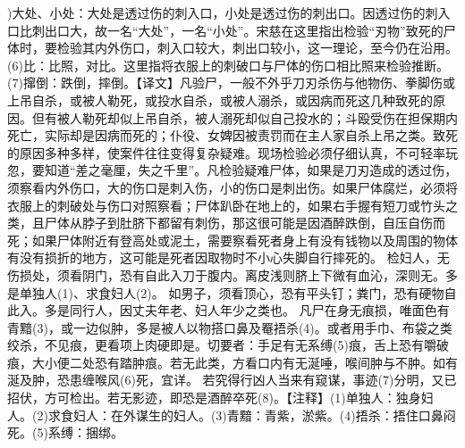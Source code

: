 \documentclass[12pt,UTF8]{ctexbook}
\begin{document}
)大处、小处：大处是透过伤的刺入口，小处是透过伤的刺出口。因透过伤的刺入口比刺出口大，故一名“大处”，一名“小处”。宋慈在这里指出检验“刃物”致死的尸体时，要检验其内外伤口，刺入口较大，刺出口较小，这一理论，至今仍在沿用。(6)比：比照，对比。这里指将衣服上的刺破口与尸体的伤口相比照来检验推断。(7)撺倒：跌倒，摔倒。【译文】凡验尸，一般不外乎刀刃杀伤与他物伤、拳脚伤或上吊自杀，或被人勒死，或投水自杀，或被人溺杀，或因病而死这几种致死的原因。但有被人勒死却似上吊自杀，被人溺死却似自己投水的；斗殴受伤在担保期内死亡，实际却是因病而死的；仆役、女婢因被责罚而在主人家自杀上吊之类。致死的原因多种多样，使案件往往变得复杂疑难。现场检验必须仔细认真，不可轻率玩忽，要知道“差之毫厘，失之千里”。凡检验疑难尸体，如果是刀刃造成的透过伤，须察看内外伤口，大的伤口是刺入伤，小的伤口是刺出伤。如果尸体腐烂，必须将衣服上的刺破处与伤口对照察看；尸体趴卧在地上的，如果右手握有短刀或竹头之类，且尸体从脖子到肚脐下都留有刺伤，那这很可能是因酒醉跌倒，自压自伤而死；如果尸体附近有登高处或泥土，需要察看死者身上有没有钱物以及周围的物体有没有损折的地方，这可能是死者因取物时不小心失脚自行摔死的。
检妇人，无伤损处，须看阴门，恐有自此入刀于腹内。离皮浅则脐上下微有血沁，深则无。多是单独人(1)、求食妇人(2)。
如男子，须看顶心，恐有平头钉；粪门，恐有硬物自此入。多是同行人，因丈夫年老、妇人年少之类也。
凡尸在身无痕损，唯面色有青黯(3)，或一边似肿，多是被人以物搭口鼻及罨捂杀(4)。或者用手巾、布袋之类绞杀，不见痕，更看项上肉硬即是。切要者：手足有无系缚(5)痕，舌上恐有嚼破痕，大小便二处恐有踏肿痕。若无此类，方看口内有无涎唾，喉间肿与不肿。如有涎及肿，恐患缠喉风(6)死，宜详。
若究得行凶人当来有窥谋，事迹(7)分明，又已招伏，方可检出。若无影迹，即恐是酒醉卒死(8)。【注释】(1)单独人：独身妇人。(2)求食妇人：在外谋生的妇人。(3)青黯：青紫，淤紫。(4)捂杀：捂住口鼻闷死。(5)系缚：捆绑。
\end{document}

